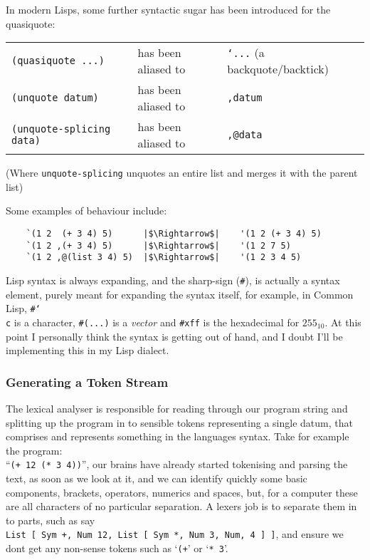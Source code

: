 \documentclass{article}
\newcommand{\code}[1]{\texttt{#1}}
\begin{document}
    In modern Lisps, some further syntactic sugar has been introduced
    for the quasiquote:\\

    \begin{tabular}{lll}
        \code{(quasiquote ...)}       & has been aliased to& \code{`...} (a backquote/backtick)\\
        \code{(unquote datum)}        & has been aliased to& \code{,datum}\\
        \code{(unquote-splicing data)}& has been aliased to& \code{,@data}
    \end{tabular}

    {\small(Where \code{unquote-splicing} unquotes an entire list and merges it with
    the parent list)}

    Some examples of behaviour include:
    \begin{verbatim}
    `(1 2  (+ 3 4) 5)      |$\Rightarrow$|    '(1 2 (+ 3 4) 5)
    `(1 2 ,(+ 3 4) 5)      |$\Rightarrow$|    '(1 2 7 5)
    `(1 2 ,@(list 3 4) 5)  |$\Rightarrow$|    '(1 2 3 4 5)
    \end{verbatim}

    Lisp syntax is always expanding, and the sharp-sign (\code{\#}), is actually
    a syntax element, purely meant for expanding the syntax itself, for example,
    in Common Lisp, \code{\#{\char`\\}c} is a character, \code{\#(...)} is a
    \emph{vector} and \code{\#xff} is the hexadecimal for $255_{10}$. At this point
    I personally think the syntax is getting out of hand, and I doubt I'll be
    implementing this in my Lisp dialect.

    \subsubsection{Generating a Token Stream} \label{lexing}
      The lexical analyser is responsible for reading through our program string
      and splitting up the program in to sensible tokens representing a single
      datum, that comprises and represents something in the languages syntax.
      Take for example the program:\\``\code{(+ 12 (* 3 4))}'', our brains have
      already started tokenising and parsing the text, as soon as we look at it,
      and we can identify quickly some basic components, brackets, operators,
      numerics and spaces, but, for a computer these are all characters of no
      particular separation. A lexers job is to separate them in to parts, such
      as say\\\code{List [ Sym +, Num 12, List [ Sym *, Num 3, Num, 4 ] ]}, and
      ensure we dont get any non-sense tokens such as `\code{(+}' or `\code{* 3}'.
\end{document}
